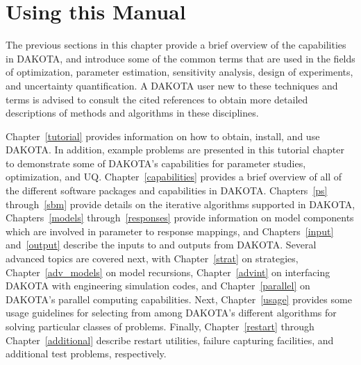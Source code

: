 

\section{Using this Manual}\label{introduction:using}

The previous sections in this chapter provide a brief overview of the
capabilities in DAKOTA, and introduce some of the common terms that
are used in the fields of optimization, parameter estimation,
sensitivity analysis, design of experiments, and uncertainty
quantification. A DAKOTA user new to these techniques and terms is
advised to consult the cited references to obtain more detailed
descriptions of methods and algorithms in these disciplines.

Chapter~\ref{tutorial} provides information on how to obtain, install,
and use DAKOTA. In addition, example problems are presented in this
tutorial chapter to demonstrate some of DAKOTA's capabilities for
parameter studies, optimization, and UQ. Chapter~\ref{capabilities}
provides a brief overview of all of the different software packages
and capabilities in DAKOTA. Chapters~\ref{ps} through~\ref{sbm}
provide details on the iterative algorithms supported in DAKOTA,
Chapters~\ref{models} through~\ref{responses} provide information on
model components which are involved in parameter to response mappings,
and Chapters~\ref{input} and~\ref{output} describe the inputs to and
outputs from DAKOTA.  Several advanced topics are covered next, with
Chapter~\ref{strat} on strategies, Chapter~\ref{adv_models} on model
recursions, Chapter~\ref{advint} on interfacing DAKOTA with
engineering simulation codes, and Chapter~\ref{parallel} on DAKOTA's
parallel computing capabilities.  Next, Chapter~\ref{usage} provides
some usage guidelines for selecting from among DAKOTA's different
algorithms for solving particular classes of problems.  Finally,
Chapter~\ref{restart} through Chapter~\ref{additional} describe
restart utilities, failure capturing facilities, and additional test
problems, respectively.
